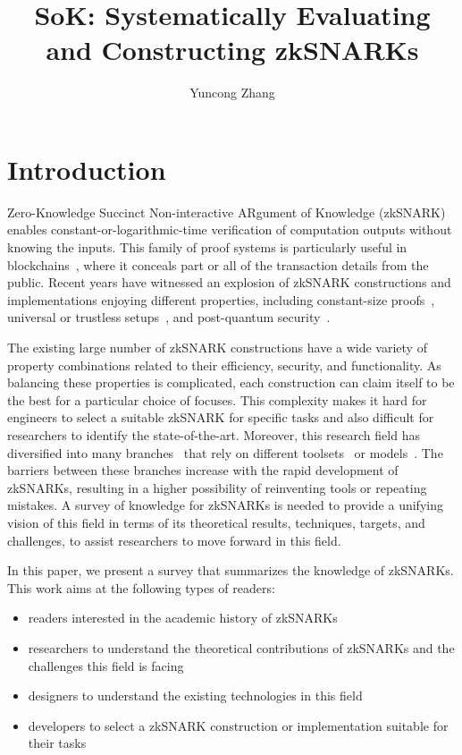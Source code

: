 \documentclass[acmtog]{acmart}
\title{SoK: Systematically Evaluating and Constructing zkSNARKs}
\author{Yuncong Zhang}
\begin{document}
\begin{abstract}
\end{abstract}

\maketitle

\section{Introduction}

Zero-Knowledge Succinct Non-interactive ARgument of Knowledge (zkSNARK)~\cite{BitanskyCCT12} enables constant-or-logarithmic-time verification of computation outputs without knowing the inputs.
This family of proof systems is particularly useful in blockchains~\cite{Ben-SassonCG0MTV14, SunALY17}, where it conceals part or all of the transaction details from the public.
Recent years have witnessed an explosion of zkSNARK constructions and implementations enjoying different properties, including constant-size proofs~\cite{Groth16, GennaroGP013, Ben-SassonCGTV13, ParnoHG013, Ben-SassonCTV13}, universal or trustless setups~\cite{GrothKMMM18, MallerBKM19, BunzFS20, Ben-SassonBHR18, Ben-SassonCRSVW19, AmesHIV17}, and post-quantum security~\cite{Ben-SassonBHR18, Ben-SassonCRSVW19}.

The existing large number of zkSNARK constructions have a wide variety of property combinations related to their efficiency, security, and functionality.
As balancing these properties is complicated, each construction can claim itself to be the best for a particular choice of focuses.
This complexity makes it hard for engineers to select a suitable zkSNARK for specific tasks and also difficult for researchers to identify the state-of-the-art.
Moreover, this research field has diversified into many branches~\cite{XieZZPS19, Nitulescu19, WalfishB15, AmesHIV17, MallerBKM19} that rely on different toolsets~\cite{KateZG10, BonehF01, FiatS86, BunzFS20} or models~\cite{BabaiFLS91, GennaroGP013, Ben-SassonCGT13}.
The barriers between these branches increase with the rapid development of zkSNARKs, resulting in a higher possibility of reinventing tools or repeating mistakes.
A survey of knowledge for zkSNARKs is needed to provide a unifying vision of this field in terms of its theoretical results, techniques, targets, and challenges, to assist researchers to move forward in this field.


In this paper, we present a survey that summarizes the knowledge of zkSNARKs.
This work aims at the following types of readers:
\begin{itemize}
	\item readers interested in the academic history of zkSNARKs
	\item researchers to understand the theoretical contributions of zkSNARKs and the challenges this field is facing
	\item designers to understand the existing technologies in this field
	\item developers to select a zkSNARK construction or implementation suitable for their tasks
\end{itemize}
\end{document}
